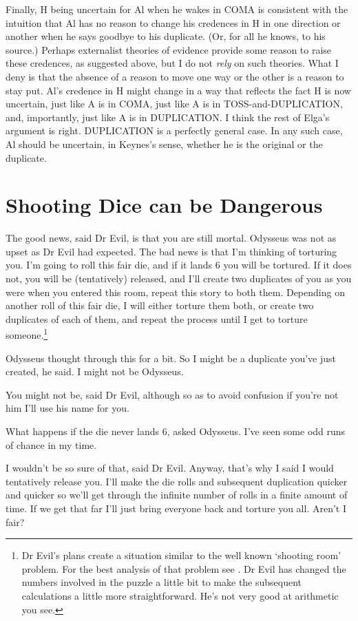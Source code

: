 Finally, H being uncertain for Al when he wakes in COMA is consistent with the intuition that Al has no reason to change his credences in H in one direction or another when he says goodbye to his duplicate. (Or, for all he knows, to his source.) Perhaps externalist theories of evidence provide some reason to raise these credences, as suggested above, but I do not \textit{rely }on such theories. What I deny is that the absence of a reason to move one way or the other is a reason to stay put. Al's credence in H might change in a way that reflects the fact H is now uncertain, just like A is in COMA, just like A is in TOSS-and-DUPLICATION, and, importantly, just like A is in DUPLICATION. I think the rest of Elga's argument is right. DUPLICATION is a perfectly general case. In any such case, Al should be uncertain, in Keynes's sense, whether he is the original or the duplicate.


\section{Shooting Dice can be Dangerous}

The good news, said Dr Evil, is that you are still mortal. Odysseus was not as upset as Dr Evil had expected. The bad news is that I'm thinking of torturing you. I'm going to roll this fair die, and if it lands 6 you will be tortured. If it does not, you will be (tentatively) released, and I'll create two duplicates of you as you were when you entered this room, repeat this story to both them. Depending on another roll of this fair die, I will either torture them both, or create two duplicates of each of them, and repeat the process until I get to torture someone.\footnote{Dr Evil's plans create a situation similar to the well known `shooting room' problem. For the best analysis of that problem see \citet{Bartha1999}. Dr Evil has changed the numbers involved in the puzzle a little bit to make the subsequent calculations a little more straightforward. He's not very good at arithmetic you see.}

Odysseus thought through this for a bit. So I might be a duplicate you've just created, he said. I might not be Odysseus.

You might not be, said Dr Evil, although so as to avoid confusion if you're not him I'll use his name for you.

What happens if the die never lands 6, asked Odysseus. I've seen some odd runs of chance in my time.

I wouldn't be so sure of that, said Dr Evil. Anyway, that's why I said I would tentatively release you. I'll make the die rolls and subsequent duplication quicker and quicker so we'll get through the infinite number of rolls in a finite amount of time. If we get that far I'll just bring everyone back and torture you all. Aren't I fair?

